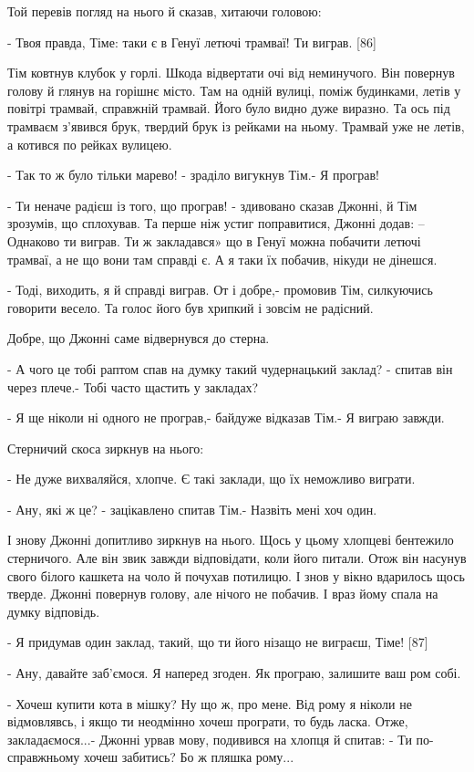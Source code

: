 Той перевів погляд на нього й сказав, хитаючи головою:

- Твоя правда, Тіме: таки є в Генуї летючі трамваї! Ти виграв. [86]

Тім ковтнув клубок у горлі. Шкода відвертати очі від неминучого. Він повернув голову й глянув на горішнє місто. Там на одній вулиці, поміж будинками, летів у повітрі трамвай, справжній трамвай. Його було видно дуже виразно. Та ось під трамваєм з'явився брук, твердий брук із рейками на ньому. Трамвай уже не летів, а котився по рейках вулицею.

- Так то ж було тільки марево! - зраділо вигукнув Тім.- Я програв!

- Ти неначе радієш із того, що програв! - здивовано сказав Джонні, й Тім зрозумів, що сплохував. Та перше ніж устиг поправитися, Джонні додав: --Однаково ти виграв. Ти ж закладався» що в Генуї можна побачити летючі трамваї, а не що вони там справді є. А я таки їх побачив, нікуди не дінешся.

- Тоді, виходить, я й справді виграв. От і добре,- промовив Тім, силкуючись говорити весело. Та голос його був хрипкий і зовсім не радісний.

Добре, що Джонні саме відвернувся до стерна.

- А чого це тобі раптом спав на думку такий чудернацький заклад? - спитав він через плече.- Тобі часто щастить у закладах?

- Я ще ніколи ні одного не програв,- байдуже відказав Тім.- Я виграю завжди.

Стерничий скоса зиркнув на нього:

- Не дуже вихваляйся, хлопче. Є такі заклади, що їх неможливо виграти.

- Ану, які ж це? - зацікавлено спитав Тім.- Назвіть мені хоч один.

І знову Джонні допитливо зиркнув на нього. Щось у цьому хлопцеві бентежило стерничого. Але він звик завжди відповідати, коли його питали. Отож він насунув свого білого кашкета на чоло й почухав потилицю. І знов у вікно вдарилось щось тверде. Джонні повернув голову, але нічого не побачив. І враз йому спала на думку відповідь.

- Я придумав один заклад, такий, що ти його нізащо не виграєш, Тіме! [87]

- Ану, давайте заб'ємося. Я наперед згоден. Як програю, залишите ваш ром собі.

- Хочеш купити кота в мішку? Ну що ж, про мене. Від рому я ніколи не відмовлявсь, і якщо ти неодмінно хочеш програти, то будь ласка. Отже, закладаємося...- Джонні урвав мову, подивився на хлопця й спитав: - Ти по-справжньому хочеш забитись? Бо ж пляшка рому...


